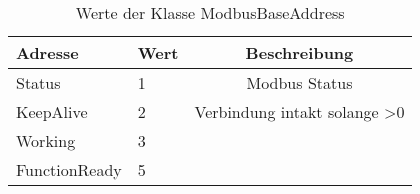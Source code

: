 \begin{table}[h]
\centering
\caption{Werte der Klasse ModbusBaseAddress}
\begin{tabular}{|l|l|c|}
\hline
Adresse & Wert & Beschreibung \\
\hline
Status & 1  & Modbus Status  \\
\hline
KeepAlive & 2 & Verbindung intakt solange >0 \\
\hline
Working & 3 &  \\
\hline

\hline
    FunctionReady & 5 & \\

\end{tabular}\label{tab:ModbusBase}
\end{table}
